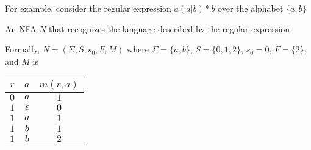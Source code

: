 \documentclass[8pt,a4paper,compress]{beamer}
\begin{document}
\begin{frame}[fragile]
\pause

For example, consider the regular expression $a(a|b)\!*\!b$ over the alphabet $\{a, b\}$

\pause\bigskip

An NFA $N$ that recognizes the language described by the regular expression

\begin{center}
\end{center}

\pause\bigskip

Formally, $N = (\Sigma, S, s_0, F, M)$ where $\Sigma = \{a, b\}$, $S = \{0, 1, 2\}$, $s_0 = 0$, $F = \{2\}$, and $M$ is
\begin{center}
\begin{tabular}{|c|c|c|} \hline
$r$ & $a$ & $m(r, a)$ \\ \hline \hline
$0$ & $a$ & $1$ \\ \hline
$1$ & $\epsilon$ & $0$ \\ \hline
$1$ & $a$ & $1$ \\ \hline
$1$ & $b$ & $1$ \\ \hline
$1$ & $b$ & $2$ \\ \hline
\end{tabular}
\end{center}
\end{frame}
\end{document}
